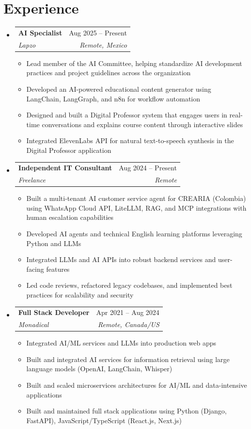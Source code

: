 \documentclass[letterpaper,11pt]{article}
\makeatletter
\newcommand{\resumeSubheading}[4]{
  \vspace{-2pt}
  \item[]
  \begin{tabular*}{\textwidth}{@{\extracolsep{\fill}}l r}
    \textbf{#1} & #2 \\
    \textit{#3} & \textit{#4} \\
  \end{tabular*}
  \vspace{-5pt}
}
\makeatother
\begin{document}
\section{Experience}
\begin{itemize}[leftmargin=0pt, itemindent=0pt, label={}, itemsep=1pt]
\resumeSubheading
{AI Specialist}{Aug 2025 -- Present}
{Lapzo}{Remote, Mexico}
\begin{itemize}[leftmargin=*, itemsep=0pt]
    \item Lead member of the AI Committee, helping standardize AI development practices and project guidelines across the organization
    \item Developed an AI-powered educational content generator using LangChain, LangGraph, and n8n for workflow automation
    \item Designed and built a Digital Professor system that engages users in real-time conversations and explains course content through interactive slides
    \item Integrated ElevenLabs API for natural text-to-speech synthesis in the Digital Professor application
\end{itemize}

\resumeSubheading
{Independent IT Consultant}{Aug 2024 -- Present}
{Freelance}{Remote}
\begin{itemize}[leftmargin=*, itemsep=0pt]
    \item Built a multi-tenant AI customer service agent for CREARIA (Colombia) using WhatsApp Cloud API, LiteLLM, RAG, and MCP integrations with human escalation capabilities
    \item Developed AI agents and technical English learning platforms leveraging Python and LLMs
    \item Integrated LLMs and AI APIs into robust backend services and user-facing features
    \item Led code reviews, refactored legacy codebases, and implemented best practices for scalability and security
\end{itemize}

\resumeSubheading
{Full Stack Developer}{Apr 2021 -- Aug 2024}
{Monadical}{Remote, Canada/US}
\begin{itemize}[leftmargin=*, itemsep=0pt]
    \item Integrated AI/ML services and LLMs into production web apps
    \item Built and integrated AI services for information retrieval using large language models (OpenAI, LangChain, Whisper)
    \item Built and scaled microservices architectures for AI/ML and data-intensive applications
    \item Built and maintained full stack applications using Python (Django, FastAPI), JavaScript/TypeScript (React.js, Next.js)
\end{itemize}


\end{itemize}
\end{document}
